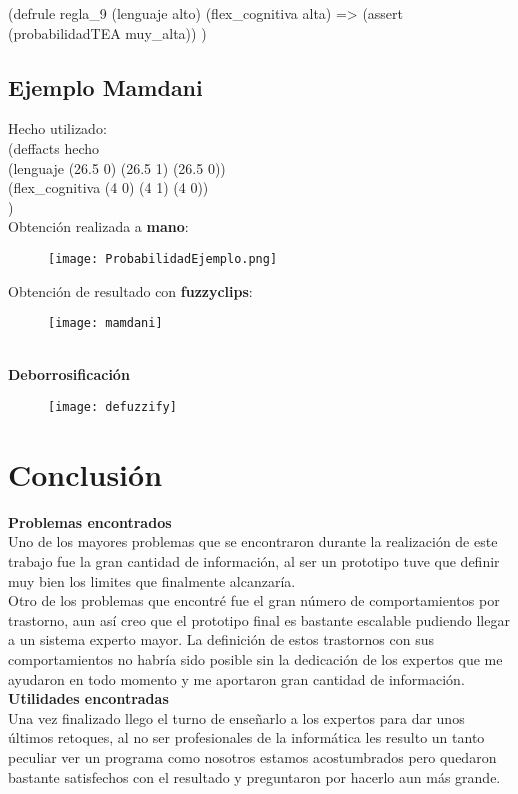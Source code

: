 \documentclass[letterpaper,12pt]{article}
\begin{document}
(defrule regla\_9
(lenguaje alto)
(flex\_cognitiva alta)
=\textgreater
(assert (probabilidadTEA muy\_alta))
)

\newpage
\subsection{Ejemplo Mamdani}
Hecho utilizado: \\
(deffacts hecho
\\
(lenguaje (26.5 0) (26.5 1) (26.5 0))
\\
(flex\_cognitiva (4 0) (4 1) (4 0))
\\
) \\

Obtención realizada a \textbf{mano}: 
\begin{figure}[h!]
	\begin{center}
		\texttt{[image: ProbabilidadEjemplo.png]}
	\end{center}
\end{figure} 
\newpage
Obtención de resultado con \textbf{fuzzyclips}: 
\begin{figure}[h!]
	\centering
	\texttt{[image: mamdani]}
\end{figure} \\
\textbf{Deborrosificación}
\begin{figure}
	\centering
	\texttt{[image: defuzzify]}
\end{figure}
 \newpage
\section{Conclusión}
\textbf{Problemas encontrados} \\
Uno de los mayores problemas que se encontraron durante la realización de este trabajo fue la gran cantidad de información, al ser un prototipo tuve que definir muy bien los limites que finalmente alcanzaría. \\

Otro de los problemas que encontré fue el gran número de comportamientos por trastorno, aun así creo que el prototipo final es bastante escalable pudiendo llegar a un sistema experto mayor. La definición de estos trastornos con sus comportamientos no habría sido posible sin la dedicación de los expertos que me ayudaron en todo momento y me aportaron gran cantidad de información. \\

\textbf{Utilidades encontradas} \\
Una vez finalizado llego el turno de enseñarlo a los expertos para dar unos últimos retoques, al no ser profesionales de la informática les resulto un tanto peculiar ver un programa como nosotros estamos acostumbrados pero quedaron bastante satisfechos con el resultado y preguntaron por hacerlo aun más grande. \\
\end{document}
